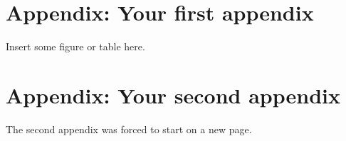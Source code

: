 \documentclass[12pt,a4paper,faculty=eb,language=en,doctype=article]{ugent-doc}
\begin{document}

\printbibliography[heading=bibintoc,title={References}] %


\appendix
\section{Appendix: Your first appendix}
Insert some figure or table here.

\newpage
\section{Appendix: Your second appendix}
The second appendix was forced to start on a new page.
\end{document}
